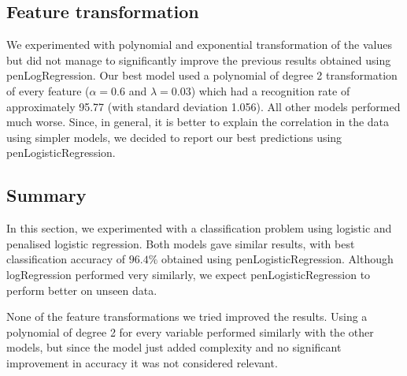 \subsection{Feature transformation}
We experimented with polynomial and exponential transformation of the values but did not manage to significantly improve the previous results obtained using penLogRegression. Our best model used a polynomial of degree 2 transformation of every feature ($\alpha=0.6$ and $\lambda=0.03$) which had a recognition rate of approximately 95.77 (with standard deviation 1.056). All other models performed much worse.
Since, in general, it is better to explain the correlation in the data using simpler models, we decided to report our best predictions using penLogisticRegression.

\subsection{Summary}

In this section, we experimented with a classification problem using logistic and penalised logistic regression. Both models gave similar results, with best classification accuracy of $96.4\%$ obtained using penLogisticRegression. Although logRegression performed very similarly, we expect penLogisticRegression to perform better on unseen data.

None of the feature transformations we tried improved the results. Using a polynomial of degree 2 for every variable performed similarly with the other models, but since the model just added complexity and no significant improvement in accuracy it was not considered relevant.